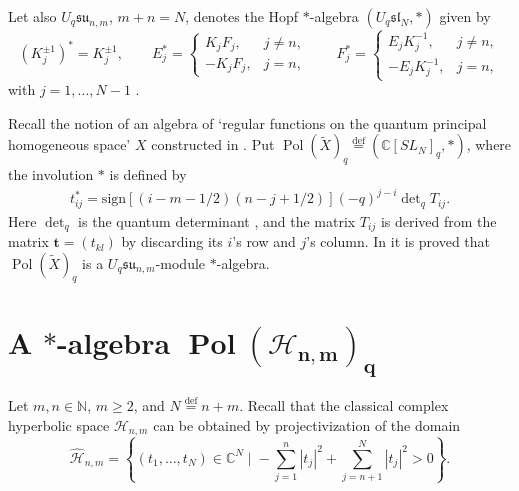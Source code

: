 \documentclass[pdftex]{sigma}
\begin{document}
Let also $U_q\mathfrak{su}_{n,m}$, $m+n=N$, denotes the Hopf $*$-algebra $(U_q \mathfrak{sl}_N,*)$ given by
\[
(K_j^{\pm 1})^*=K_j^{\pm 1},\qquad E_j^*=
\begin{cases}
K_jF_j,& j \ne n,
\\ -K_jF_j,& j=n,
\end{cases}\qquad F_j^*=
\begin{cases}
E_jK_j^{-1},& j \ne n,
\\ -E_jK_j^{-1},& j=n,
\end{cases}
\]
with $j=1,\ldots,N-1$ \cite{RTF, polmat}.

Recall the notion of an algebra of `regular functions on the quantum principal homogeneous space' $X$
constructed in \cite{polmat}. Put $\operatorname{Pol}(\widetilde{X})_q\overset{\mathrm{def}}{=}
(\mathbb{C}[SL_N]_q,*)$, where the involution $*$ is def\/ined by
\begin{gather}\label{def_inv}
t_{ij}^*=\mathrm{sign}[(i-m-1/2)(n-j+1/2)](-q)^{j-i}\det\nolimits_qT_{ij}.
\end{gather}
Here $\det_q$ is the quantum determinant \cite{Ch-P}, and the matrix $T_{ij}$ is derived from the matrix
$\mathbf{t}=(t_{kl})$ by discarding its $i$'s row and $j$'s column. In \cite{polmat} it is proved that
$\operatorname{Pol}(\widetilde{X})_q$ is a $U_{q}\mathfrak{su}_{n,m}$-module $*$-algebra.

\section[A $*$-algebra $\operatorname{Pol}(\mathscr{H}_{n,m})_{q}$]{A $\boldsymbol{*}$-algebra $\boldsymbol{\operatorname{Pol}(\mathscr{H}_{n,m})_{q}}$}\label{sec_2}

Let $m,n\in\mathbb{N}$, $m\ge 2$, and $N\overset{\mathrm{def}}{=}n+m$. Recall that the classical complex
hyperbolic space $\mathscr{H}_{n,m}$ can be obtained by projectivization of the domain
\[
\widehat{\mathscr{H}}_{n,m}=\left\{(t_1,\ldots,t_N)\in\mathbb{C}^N\; \Big|\;
-\sum^n_{j=1}|t_j|^2+\sum^N_{j=n+1}|t_{j}|^2>0 \right\}.
\]
\end{document}
